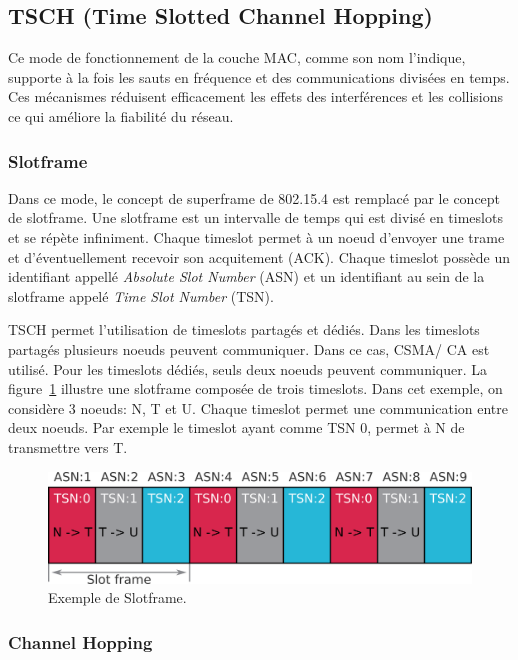 \subsection*{TSCH (Time Slotted Channel Hopping)}\label{subsec:etat_art-802.15.4.tsch}

Ce mode de fonctionnement de la couche MAC, comme son nom l'indique, supporte à la fois les sauts en fréquence et des communications divisées en temps. Ces mécanismes réduisent efficacement les effets des interférences et les collisions ce qui améliore la fiabilité du réseau.

\subsubsection*{Slotframe}
Dans ce mode, le concept de superframe de 802.15.4 est remplacé par le concept de slotframe.
Une slotframe est un intervalle de temps qui est divisé en timeslots et se répète infiniment. Chaque timeslot permet à un noeud d'envoyer une trame et d'éventuellement recevoir son acquitement (ACK).
Chaque timeslot possède un identifiant appellé \textit{Absolute Slot Number} (ASN)
et un identifiant au sein de la slotframe appelé \textit{Time Slot Number} (TSN).

TSCH permet l'utilisation de timeslots partagés et dédiés. Dans les timeslots partagés plusieurs noeuds peuvent communiquer. Dans ce cas, CSMA/ CA est utilisé. Pour les timeslots dédiés, seuls deux noeuds peuvent communiquer. La figure~\ref{fig:state-slotframe} illustre une slotframe composée de trois timeslots.
Dans cet exemple, on considère 3 noeuds: N, T et U. Chaque timeslot permet une communication entre deux noeuds.
Par exemple le timeslot ayant comme TSN 0, permet à N de transmettre vers T.

\begin{figure}[H]
  \centering
  \includegraphics[scale=0.7]{res/pictures/sloframe.png}
  \caption{Exemple de Slotframe.}
  \label{fig:state-slotframe}
\end{figure}

\subsubsection*{Channel Hopping}

